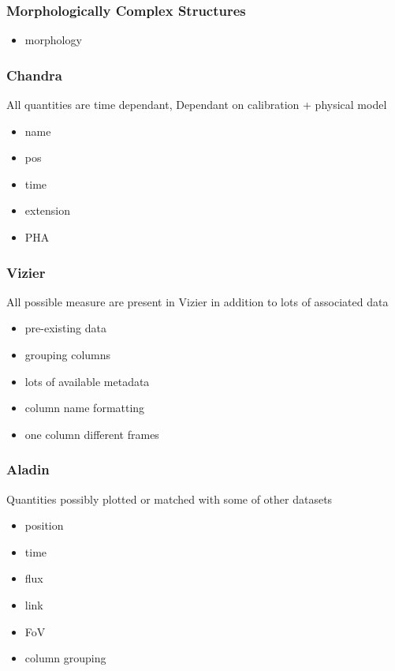 \documentclass[11pt,a4paper]{ivoa}
\begin{document}
\subsubsection{Morphologically Complex Structures}
\begin{itemize}    
    \item morphology
\end{itemize}

\subsubsection{Chandra} 
All quantities are time dependant,
Dependant on calibration + physical
model
\begin{itemize}    
    \item name
    \item pos
    \item time
    \item extension
    \item PHA 
\end{itemize}

\subsubsection{Vizier} 
All possible measure are present in Vizier in addition to lots of associated data 
\begin{itemize}    
    \item pre-existing data
    \item grouping columns
    \item lots of available metadata
    \item column name formatting
    \item one column different frames
\end{itemize}

\subsubsection{Aladin}

Quantities possibly plotted or matched with some of other datasets
\begin{itemize}
    \item position
    \item time
    \item flux
    \item link
    \item FoV
    \item column grouping
\end{itemize}
\end{document}
